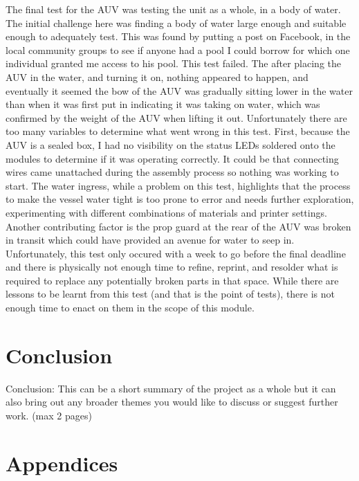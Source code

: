 \documentclass[11pt,a4paper,titlepage]{report}
\begin{document}
	The final test for the AUV was testing the unit as a whole, in a body of water. The initial challenge here was finding a body of water large enough and suitable enough to adequately test. This was found by putting a post on Facebook, in the local community groups to see if anyone had a pool I could borrow for which one individual granted me access to his pool. This test failed. The after placing the AUV in the water, and turning it on, nothing appeared to happen, and eventually it seemed the bow of the AUV was gradually sitting lower in the water than when it was first put in indicating it was taking on water, which was confirmed by the weight of the AUV when lifting it out. Unfortunately there are too many variables to determine what went wrong in this test. First, because the AUV is a sealed box, I had no visibility on the status LEDs soldered onto the modules to determine if it was operating correctly. It could be that connecting wires came unattached during the assembly process so nothing was working to start. The water ingress, while a problem on this test, highlights that the process to make the vessel water tight is too prone to error and needs further exploration, experimenting with different combinations of materials and printer settings. Another contributing factor is the prop guard at the rear of the AUV was broken in transit which could have provided an avenue for water to seep in. Unfortunately, this test only occured with a week to go before the final deadline and there is physically not enough time to refine, reprint, and resolder what is required to replace any potentially broken parts in that space. While there are lessons to be learnt from this test (and that is the point of tests), there is not enough time to enact on them in the scope of this module.   
	
	
	\chapter*{Conclusion}
	Conclusion: This can be a short summary of the project as a whole but it can also bring out any broader themes you would like to discuss or suggest further work. (max 2 pages)
	
	\chapter*{Appendices}
\end{document}
